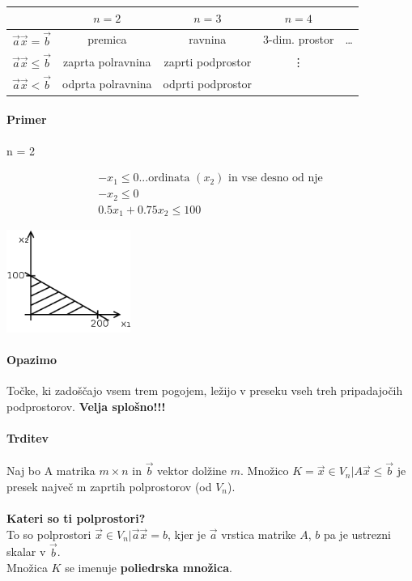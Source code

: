 \documentclass[a4paper,10pt]{article}
\begin{document}
\begin{tabular}{|c|c|c|c|c|}\hline
				& $n=2$			& $n=3$			& $n=4$			&	\\\hline
$\vec a \vec x = \vec b$	& premica		& ravnina		& 3-dim. prostor	& \dots	\\
$\vec a \vec x \leq \vec b$	& zaprta polravnina	& zaprti podprostor	& \vdots		&	\\
$\vec a \vec x < \vec b$	& odprta polravnina	& odprti podprostor	&			&	\\
\end{tabular}

\paragraph{Primer}
\begin{flushleft}
n = 2
\end{flushleft}
\begin{eqnarray*}
-x_1 \leq 0 \mbox{...ordinata } (x_2) \mbox{ in vse desno od nje}\\
-x_2 \leq 0\\
0.5 x_1 + 0.75 x_2 \leq 100
\end{eqnarray*}

\begin{center}
	\includegraphics[width=4.05cm,height=3.35cm]{Slike/KPMPrimer1.png}
\end{center}

\paragraph{Opazimo}
To\v cke, ki zado\v s\v cajo vsem trem pogojem, le\v zijo v preseku vseh treh pripadajo\v cih podprostorov. \textbf{Velja splo\v sno!!!}

\paragraph{Trditev}
Naj bo A matrika $m \times n$ in $\vec b$ vektor dol\v zine $m$. Mno\v zico $K = {\vec{x} \in V_n | A \vec{x} \leq \vec b}$ je presek najve\v c m zaprtih polprostorov (od $V_n$).\\
\\
\textbf{Kateri so ti polprostori?}\\
To so polprostori ${\vec x \in V_n | \vec a \vec x = b}$, kjer je $\vec a$ vrstica matrike $A$, $b$ pa je ustrezni skalar v $\vec b$.\\
Mno\v zica $K$ se imenuje \textbf{poliedrska mno\v zica}.
\end{document}
